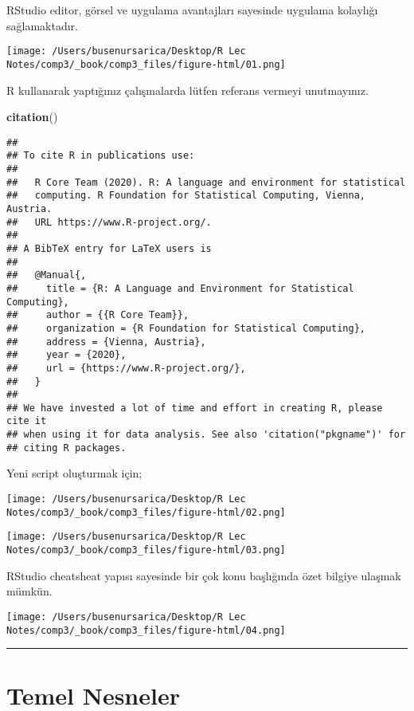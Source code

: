 \documentclass[
]{book}
\newenvironment{Shaded}{\begin{snugshade}}{\end{snugshade}}
\newcommand{\KeywordTok}[1]{\textcolor[rgb]{0.13,0.29,0.53}{\textbf{#1}}}
\newcommand{\NormalTok}[1]{#1}
\begin{document}
RStudio editor, görsel ve uygulama avantajları sayesinde uygulama kolaylığı sağlamaktadır.

\texttt{[image: /Users/busenursarica/Desktop/R Lec Notes/comp3/\_book/comp3\_files/figure-html/01.png]}

R kullanarak yaptığınız çalışmalarda lütfen referans vermeyi unutmayınız.

\begin{Shaded}
\begin{Highlighting}[]
\KeywordTok{citation}\NormalTok{()}
\end{Highlighting}
\end{Shaded}

\begin{verbatim}
## 
## To cite R in publications use:
## 
##   R Core Team (2020). R: A language and environment for statistical
##   computing. R Foundation for Statistical Computing, Vienna, Austria.
##   URL https://www.R-project.org/.
## 
## A BibTeX entry for LaTeX users is
## 
##   @Manual{,
##     title = {R: A Language and Environment for Statistical Computing},
##     author = {{R Core Team}},
##     organization = {R Foundation for Statistical Computing},
##     address = {Vienna, Austria},
##     year = {2020},
##     url = {https://www.R-project.org/},
##   }
## 
## We have invested a lot of time and effort in creating R, please cite it
## when using it for data analysis. See also 'citation("pkgname")' for
## citing R packages.
\end{verbatim}

Yeni script oluşturmak için;

\texttt{[image: /Users/busenursarica/Desktop/R Lec Notes/comp3/\_book/comp3\_files/figure-html/02.png]}

\texttt{[image: /Users/busenursarica/Desktop/R Lec Notes/comp3/\_book/comp3\_files/figure-html/03.png]}

RStudio cheatsheat yapısı sayesinde bir çok konu başlığında özet bilgiye ulaşmak mümkün.

\texttt{[image: /Users/busenursarica/Desktop/R Lec Notes/comp3/\_book/comp3\_files/figure-html/04.png]}

\begin{center}\rule{0.5\linewidth}{0.5pt}\end{center}

\hypertarget{temel-nesneler}{%
\chapter{Temel Nesneler}\label{temel-nesneler}}
\end{document}
